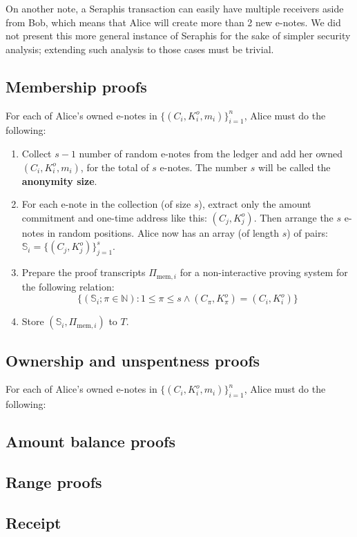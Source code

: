 \documentclass{article}
\begin{document}
On another note, a Seraphis transaction can easily have multiple receivers aside from Bob, which means that Alice will create more than 2 new e-notes. We did not present this more general instance of Seraphis for the sake of simpler security analysis; extending such analysis to those cases must be trivial.

\subsection{Membership proofs}
For each of Alice's owned e-notes in $\{(C_i,K_i^o,m_i)\}_{i=1}^n$, Alice must do the following:
\begin{enumerate}
    \item Collect $s-1$ number of random e-notes from the ledger and add her owned $(C_i,K_i^o,m_i)$, for the total of $s$ e-notes. The number $s$ will be called the \textbf{anonymity size}.
    \item For each e-note in the collection (of size $s$), extract only the amount commitment and one-time address like this: $(C_j, K_j^o)$. Then arrange the $s$ e-notes in random positions. Alice now has an array (of length $s$) of pairs: $\mathbb{S}_i = \{(C_j, K_j^o)\}_{j=1}^s$.
    \item Prepare the proof transcripts $\Pi_{\text{mem}, i}$ for a non-interactive proving system for the following relation:
$$\{(\mathbb{S}_i; \pi\in\mathbb{N}): 1\le\pi\le s \wedge (C_\pi, K_\pi^o) = (C_i, K_i^o) \}$$
    \item Store $(\mathbb{S}_i, \Pi_{\text{mem}, i})$ to $T$.
\end{enumerate}
\subsection{Ownership and unspentness proofs}
For each of Alice's owned e-notes in $\{(C_i,K_i^o,m_i)\}_{i=1}^n$, Alice must do the following:

\subsection{Amount balance proofs}

\subsection{Range proofs}

\subsection{Receipt}
\end{document}
